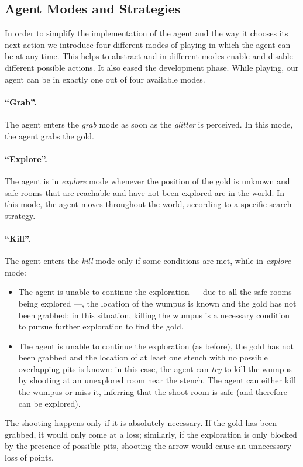 \documentclass{llncs}
\begin{document}
\subsection{Agent Modes and Strategies}

In order to simplify the implementation of the agent and the way it chooses its next action we introduce four different modes of playing in which the agent can be at any time.
This helps to abstract and in different modes enable and disable different possible actions.
It also eased the development phase.
While playing, our agent can be in exactly one out of four available modes.

\paragraph{\enquote{Grab}.} The agent enters the \emph{grab} mode as soon as the \emph{glitter} is perceived. In this mode, the agent grabs the gold.

\paragraph{\enquote{Explore}.} The agent is in \emph{explore} mode whenever the position of the gold is unknown and safe rooms that are reachable and have not been explored are in the world.
In this mode, the agent moves throughout the world, according to a specific search strategy.

\paragraph{\enquote{Kill}.} The agent enters the \emph{kill} mode only if some conditions are met, while in \emph{explore} mode:
\begin{itemize}
	\item The agent is unable to continue the exploration --- due to all the safe rooms being explored ---, the location of the wumpus is known and the gold has not been grabbed: in this situation, killing the wumpus is a necessary condition to pursue further exploration to find the gold.
	\item The agent is unable to continue the exploration (as before), the gold has not been grabbed and the location of at least one stench with no possible overlapping pits is known: in this case, the agent can \emph{try} to kill the wumpus by shooting at an unexplored room near the stench.
	The agent can either kill the wumpus or miss it, inferring that the shoot room is safe (and therefore can be explored).
\end{itemize}
The shooting happens only if it is absolutely necessary.
If the gold has been grabbed, it would only come at a loss; similarly, if the exploration is only blocked by the presence of possible pits, shooting the arrow would cause an unnecessary loss of points.
\end{document}
